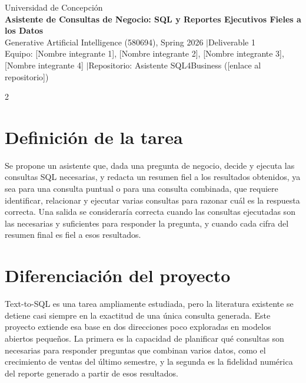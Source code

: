 \documentclass[10pt]{article}
\begin{document}
\begin{center}
{\color{ucgray}\small Universidad de Concepci\'on}\\[2pt]
{\Large\bfseries\color{ucblue} Asistente de Consultas de Negocio: SQL y Reportes Ejecutivos Fieles a los Datos}\\[3pt]
{\small Generative Artificial Intelligence (580694), Spring 2026 \quad$\vert$\quad Deliverable 1}\\[2pt]
{\small Equipo: [Nombre integrante 1], [Nombre integrante 2], [Nombre integrante 3], [Nombre integrante 4] \quad$\vert$\quad Repositorio: Asistente SQL4Business ([enlace al repositorio])}
\end{center}

\vspace{2pt}

\begin{multicols}{2}

\section{Definici\'on de la tarea}
Se propone un asistente que, dada una pregunta de negocio, decide y ejecuta las consultas SQL necesarias, y redacta un resumen fiel a los resultados obtenidos, ya sea para una consulta puntual o para una consulta combinada, que requiere identificar, relacionar y ejecutar varias consultas para razonar cu\'al es la respuesta correcta. Una salida se considerar\'ia correcta cuando las consultas ejecutadas son las necesarias y suficientes para responder la pregunta, y cuando cada cifra del resumen final es fiel a esos resultados.

\section{Diferenciaci\'on del proyecto}
Text-to-SQL es una tarea ampliamente estudiada, pero la literatura existente se detiene casi siempre en la exactitud de una \'unica consulta generada. Este proyecto extiende esa base en dos direcciones poco exploradas en modelos abiertos peque\~nos. La primera es la capacidad de planificar qu\'e consultas son necesarias para responder preguntas que combinan varios datos, como el crecimiento de ventas del \'ultimo semestre, y la segunda es la fidelidad num\'erica del reporte generado a partir de esos resultados.


\end{multicols}
\end{document}
